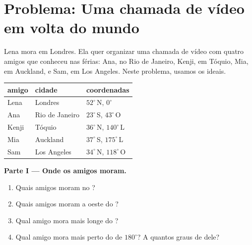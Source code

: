 \section{Problema: Uma chamada de vídeo em volta do mundo}

\begin{problem}
\label{pb:g6:latitude-longitude:1}
Lena mora em Londres. Ela quer organizar uma chamada de vídeo com quatro
amigos que conheceu nas férias: Ana, no Rio de Janeiro, Kenji, em Tóquio,
Mia, em Auckland, e Sam, em Los Angeles. Neste problema, usamos os  ideais.

\begin{center}
\small
\begin{tabular}{lll}
\hline
amigo & cidade & coordenadas\\
\hline
Lena & Londres & $52^\circ$\,N, $0^\circ$\\
Ana & Rio de Janeiro & $23^\circ$\,S, $43^\circ$\,O\\
Kenji & Tóquio & $36^\circ$\,N, $140^\circ$\,L\\
Mia & Auckland & $37^\circ$\,S, $175^\circ$\,L\\
Sam & Los Angeles & $34^\circ$\,N, $118^\circ$\,O\\
\hline
\end{tabular}
\end{center}

\medskip
\noindent\textbf{Parte I --- Onde os amigos moram.}
\begin{enumerate}
  \item Quais amigos moram no ?
  \item Quais amigos moram a oeste do ?
  \item Qual amigo mora mais longe do ?
  \item Qual amigo mora mais perto do  de $180^\circ$? A quantos
        graus de  dele?
\end{enumerate}


\end{problem}
